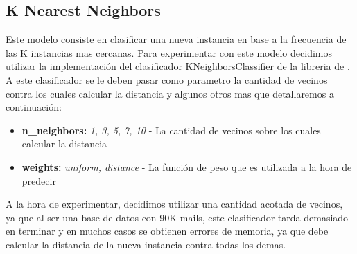 \subsection{K Nearest Neighbors}
Este modelo consiste en clasificar una nueva instancia en base a la frecuencia de las K instancias mas cercanas.
Para experimentar con este modelo decidimos utilizar la implementación del clasificador KNeighborsClassifier de la libreria de .
A este clasificador se le deben pasar como parametro la cantidad de vecinos contra los cuales calcular la distancia y algunos otros mas que detallaremos a continuación:
\begin{itemize}
\item \textbf{n\_neighbors:} \textit{1, 3, 5, 7, 10} - La cantidad de vecinos sobre los cuales calcular la distancia
\item \textbf{weights:} \textit{uniform, distance} - La función de peso que es utilizada a la hora de predecir
\end{itemize}
A la hora de experimentar, decidimos utilizar una cantidad acotada de vecinos, ya que al ser una base de datos con 90K mails, este clasificador tarda demasiado
en terminar y en muchos casos se obtienen errores de memoria, ya que debe calcular la distancia de la nueva instancia contra todas los demas.
